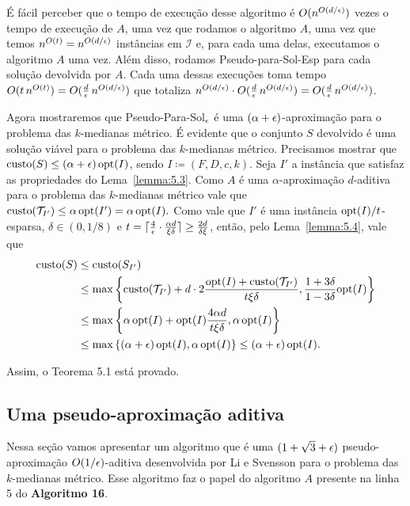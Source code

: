 É fácil perceber que o tempo de execução desse algoritmo é $O(n^{O(d/\epsilon)})$ vezes o tempo de execução de $A$, uma vez que rodamos o algoritmo $A$, uma vez que temos $n^{O(t)} = n^{O(d/\epsilon)}$ instâncias em $\mathcal{I}$ e, para cada uma delas, executamos o algoritmo $A$ uma vez. Além disso, rodamos {\sc Pseudo-para-Sol-Esp} para cada solução devolvida por $A$. Cada uma dessas execuções toma tempo $O(t\,n^{O(t)}) = O(\frac{d}{\epsilon} \, n^{O(d/\epsilon)})$ que totaliza $n^{O(d/\epsilon)} \cdot O(\frac{d}{\epsilon} \, n^{O(d/\epsilon)}) = O(\frac{d}{\epsilon} \, n^{O(d/\epsilon)})$.

Agora mostraremos que {\sc Pseudo-Para-Sol}$_\epsilon$ é uma $(\alpha + \epsilon)$-aproximação para o problema das $k$-medianas métrico. É evidente que o conjunto $S$ devolvido é uma solução viável para o problema das $k$-medianas métrico. Precisamos mostrar que ${\text{custo}(S) \leq (\alpha + \epsilon)\, \mathrm{opt}(I)}$, sendo $I \coloneq (F,D,c,k)$. Seja $I'$ a instância que satisfaz as propriedades do Lema~\ref{lemma:5.3}. Como $A$ é uma $\alpha$-aproximação $d$-aditiva para o problema das $k$-medianas métrico vale que
\(
    \text{custo}(\mathcal{T}_{I'}) \leq \alpha \, \mathrm{opt}(I') = \alpha \, \mathrm{opt}(I). \nonumber
\) 
Como vale que $I'$ é uma instância $\mathrm{opt}(I)/t$-esparsa, $\delta \in (0,1/8)$ e $t = \lceil\frac{4}{\epsilon} \cdot \frac{\alpha d}{\xi \delta}\rceil \geq \frac{2d}{\delta \xi}$, então, pelo Lema~\ref{lemma:5.4}, vale que 
\begin{align}
    \text{custo}(S) &\leq \text{custo}(S_{I'}) \nonumber\\
    &\leq \max \left\{ \text{custo}(\mathcal{T}_{I'}) + d \cdot 2 \frac{\mathrm{opt}(I) + \text{custo}(\mathcal{T}_{I'})}{t\xi\delta}, \frac{1+3\delta}{1-3\delta}\mathrm{opt}(I) \right\} \nonumber \\
    &\leq  \max \left\{ \alpha\, \mathrm{opt}(I) + \mathrm{opt}(I) \frac{4 \alpha d}{t\xi\delta}, \alpha \, \mathrm{opt}(I) \right\} \nonumber \\
    &\leq  \max \left\{ (\alpha + \epsilon)\, \mathrm{opt}(I), \alpha \, \mathrm{opt}(I) \right\} \leq (\alpha + \epsilon) \, \mathrm{opt}(I). \nonumber
\end{align}

Assim, o Teorema 5.1 está provado.

\subsection{Uma pseudo-aproximação aditiva}

Nessa seção vamos apresentar um algoritmo que é uma $(1 + \sqrt{3} + \epsilon)$ pseudo-aproximação $O(1/\epsilon)$-aditiva desenvolvida por Li e Svensson para o problema das $k$-medianas métrico. Esse algoritmo faz o papel do algoritmo $A$ presente na linha 5 do {\bf Algoritmo 16}.

